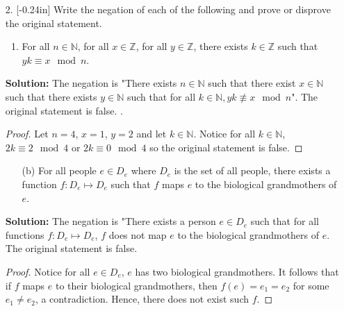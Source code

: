 \documentclass[letterpaper,12pt]{article}
\theoremstyle{definition}
\begin{document}
\pagebreak
\begin{enumerate}
    \item[2.] \reversemarginpar{}[-0.24in] Write the negation of each of the following and prove or disprove the original statement.
    \begin{enumerate}
        \item For all $n \in \mathbb{N}$, for all $x \in \mathbb{Z}$, for all $y \in \mathbb{Z}$, there exists $k \in \mathbb{Z}$ such that $yk \equiv x \mod n$.
    \end{enumerate}
     \begin{mdframed}
            \textbf{Solution:} The negation is "There exists $n \in \mathbb{N}$ such that there exist $x \in \mathbb{N}$ such that there exists $y \in \mathbb{N}$ such that for all $k \in \mathbb{N}, yk \not \equiv x \mod n$". The original statement is false.
            . \renewcommand{\proofname}{Disproof} \begin{proof}
                Let $n = 4$, $x = 1$, $y = 2$ and let $k\in \mathbb{N}$. Notice for all $k \in \mathbb{N}$, $2k \equiv 2 \mod 4$ or $2k \equiv 0 \mod 4$ so the original statement is false.
            \end{proof}
        \end{mdframed}
\end{enumerate}
\pagebreak
\begin{enumerate}
    \item[] \begin{enumerate}
        \item[(b)] For all people $e \in D_e$ where $D_e$ is the set of all people, there exists a function $f:D_e \mapsto D_e$ such that $f$ maps $e$ to the biological grandmothers of $e$.
    \end{enumerate}
     \begin{mdframed}
            \textbf{Solution:}
            The negation is "There exists a person $e \in D_e$ such that for all functions $f:D_e \mapsto D_e$, $f$ does not map $e$ to the biological grandmothers of $e$. The original statement is false. \renewcommand{\proofname}{Disproof}  \begin{proof}
                Notice for all $e \in D_e$, $e$ has two biological grandmothers. It follows that if $f$ maps $e$ to their biological grandmothers, then $f(e) = e_1 = e_2$ for some $e_1 \neq e_2$, a contradiction. Hence, there does not exist such $f$.
            \end{proof}
        \end{mdframed}
\end{enumerate}
\end{document}
